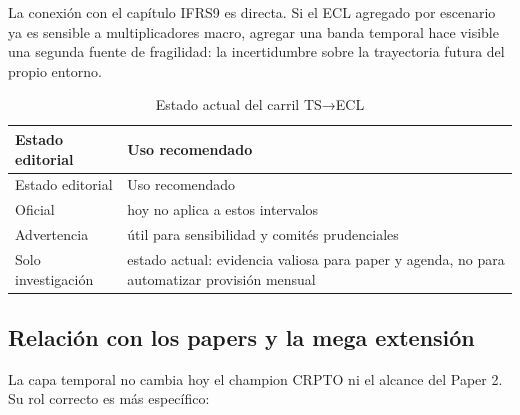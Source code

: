 \documentclass[
  spanish,
  11pt,
  letterpaper,
]{scrbook}
\theoremstyle{plain}
\theoremstyle{remark}
\begin{document}
La conexión con el capítulo IFRS9 es directa. Si el ECL agregado por
escenario ya es sensible a multiplicadores macro, agregar una banda
temporal hace visible una segunda fuente de fragilidad: la incertidumbre
sobre la trayectoria futura del propio entorno.

\begin{longtable}[]{@{}
  >{\raggedright\arraybackslash}p{}
  >{\raggedright\arraybackslash}p{}@{}}
\caption{Estado actual del carril
TS→ECL}\label{tbl-ts-ecl-status}\tabularnewline
\toprule\noalign{}
\begin{minipage}[b]{\linewidth}\raggedright
Estado editorial
\end{minipage} & \begin{minipage}[b]{\linewidth}\raggedright
Uso recomendado
\end{minipage} \\
\midrule\noalign{}
\endfirsthead
\toprule\noalign{}
\begin{minipage}[b]{\linewidth}\raggedright
Estado editorial
\end{minipage} & \begin{minipage}[b]{\linewidth}\raggedright
Uso recomendado
\end{minipage} \\
\midrule\noalign{}
\endhead
\bottomrule\noalign{}
\endlastfoot
Oficial & hoy no aplica a estos intervalos \\
Advertencia & útil para sensibilidad y comités prudenciales \\
Solo investigación & estado actual: evidencia valiosa para paper y
agenda, no para automatizar provisión mensual \\
\end{longtable}

\subsection{Relación con los papers y la mega
extensión}\label{relaciuxf3n-con-los-papers-y-la-mega-extensiuxf3n}

La capa temporal no cambia hoy el champion CRPTO ni el alcance del Paper
2. Su rol correcto es más específico:
\end{document}
